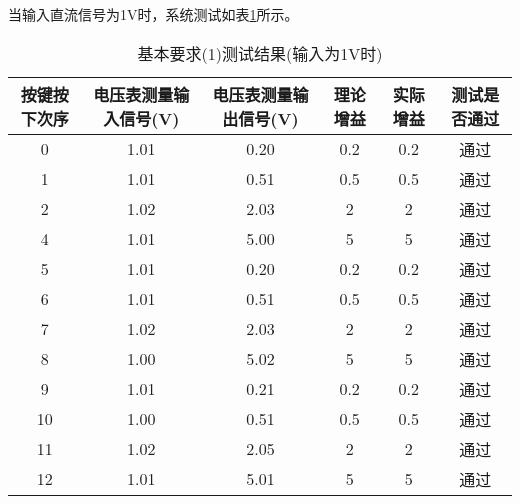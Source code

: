 \documentclass[lang=cn,11pt,a4paper]{elegantpaper}
\begin{document}
当输入直流信号为1V时，系统测试如表\ref{tab:1_1V}所示。
\begin{table}[!ht]
  \centering
  \caption{基本要求(1)测试结果(输入为1V时)}
  \begin{tabular}{cccccc}
    \textbf{按键按下次序} & \textbf{电压表测量输入信号(V)} & \textbf{电压表测量输出信号(V)} & \textbf{理论增益} & \textbf{实际增益} & \textbf{测试是否通过} \\ \hline
    0               & 1.01                  & 0.20                  & 0.2           & 0.2           & 通过              \\
    1               & 1.01                  & 0.51                  & 0.5           & 0.5           & 通过              \\
    2               & 1.02                  & 2.03                  & 2             & 2             & 通过              \\
    4               & 1.01                  & 5.00                  & 5             & 5             & 通过              \\
    5               & 1.01                  & 0.20                  & 0.2           & 0.2           & 通过              \\
    6               & 1.01                  & 0.51                  & 0.5           & 0.5           & 通过              \\
    7               & 1.02                  & 2.03                  & 2             & 2             & 通过              \\
    8               & 1.00                  & 5.02                  & 5             & 5             & 通过              \\
    9               & 1.01                  & 0.21                  & 0.2           & 0.2           & 通过              \\
    10              & 1.00                  & 0.51                  & 0.5           & 0.5           & 通过              \\
    11              & 1.02                  & 2.05                  & 2             & 2             & 通过              \\
    12              & 1.01                  & 5.01                  & 5             & 5             & 通过              \\
  \end{tabular}
  \label{tab:1_1V}
\end{table}
\end{document}
